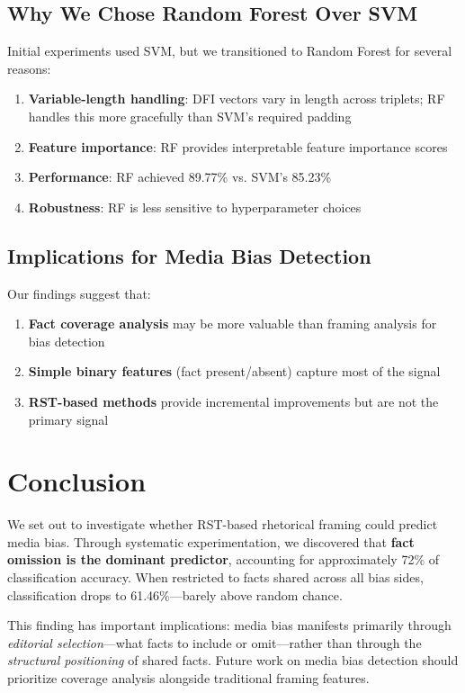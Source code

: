 \documentclass[11pt]{article}
\begin{document}
\subsection{Why We Chose Random Forest Over SVM}

Initial experiments used SVM, but we transitioned to Random Forest for several reasons:
\begin{enumerate}
    \item \textbf{Variable-length handling}: DFI vectors vary in length across triplets; RF handles this more gracefully than SVM's required padding
    \item \textbf{Feature importance}: RF provides interpretable feature importance scores
    \item \textbf{Performance}: RF achieved 89.77\% vs. SVM's 85.23\%
    \item \textbf{Robustness}: RF is less sensitive to hyperparameter choices
\end{enumerate}

\subsection{Implications for Media Bias Detection}

Our findings suggest that:
\begin{enumerate}
    \item \textbf{Fact coverage analysis} may be more valuable than framing analysis for bias detection
    \item \textbf{Simple binary features} (fact present/absent) capture most of the signal
    \item \textbf{RST-based methods} provide incremental improvements but are not the primary signal
\end{enumerate}

\section{Conclusion}

We set out to investigate whether RST-based rhetorical framing could predict media bias. Through systematic experimentation, we discovered that \textbf{fact omission is the dominant predictor}, accounting for approximately 72\% of classification accuracy. When restricted to facts shared across all bias sides, classification drops to 61.46\%---barely above random chance.

This finding has important implications: media bias manifests primarily through \textit{editorial selection}---what facts to include or omit---rather than through the \textit{structural positioning} of shared facts. Future work on media bias detection should prioritize coverage analysis alongside traditional framing features.
\end{document}
